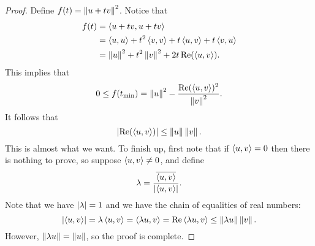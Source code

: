 \documentclass[a4paper]{article}
\begin{document}
\begin{proof}
Define $f(t) = \norm{u + tv}^2$. Notice that 
\[
\begin{aligned}
  f(t) 
  &= \braket{u + tv}{u + tv}  \\
  &= \braket{u}{u} 
  + t^2 \braket{v}{v} + t \braket{u}{v} + t \braket{v}{u} \\
  &= \norm{u}^2 + t^2 \norm{v}^2 + 2t \Re(\braket{u}{v}).
\end{aligned}
\]  
This implies that 
\[
0 \leq f(t_{\text{min}}) = \norm{u}^2 - 
\frac{\Re(\braket{u}{v})^2}{\norm{v}^2}.
\]
It follows that 
\[
\abs{\Re( \braket{u}{v} )} \leq \norm{u} \norm{v}.
\]
This is almost what we want. 
To finish up, first note that if 
$\braket{u}{v} = 0$ then there is nothing to prove,
so suppose $\braket{u}{v} \neq 0$,
and define 
\[
\lambda = \frac{\bar{\braket{u}{v}}}{\abs{\braket{u}{v}}}.
\]
Note that we have $\abs{\lambda} = 1$ and we have 
the chain of equalities of real numbers:
\[
\abs{\braket{u}{v}} = \lambda \braket{u}{v} 
= \braket{\lambda u}{v} = \Re \braket{\lambda u}{v} 
\leq \norm{\lambda u} \norm{v}.
\]
However, $\norm{\lambda u} = \norm{u}$, so the proof is 
complete.

\end{proof}
\end{document}
